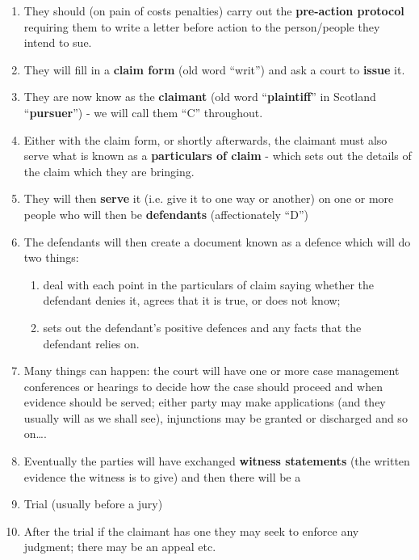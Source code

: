 \documentclass[]{article}
\begin{document}
\begin{enumerate}
\item
  {They should (on pain of costs penalties) carry out the
  }\textbf{pre-action protocol}{ requiring them to write a letter before
  action to the person/people they intend to sue.}
\item
  {They will fill in a }\textbf{claim form}{ (old word ``writ'') and ask
  a court to }\textbf{issue}{ it. }
\item
  {They are now know as the }\textbf{claimant} {(old word} \textbf{}
  {``}\textbf{plaintiff}{''} \textbf{} {in Scotland
  ``}\textbf{pursuer}{'') - we will call them ``C'' throughout.}
\item
  {Either with the claim form, or shortly afterwards, the claimant must
  also serve what is known as a }\textbf{particulars of claim}{ - which
  sets out the details of the claim which they are bringing.}
\item
  {They will then }\textbf{serve}{ it (i.e. give it to one way or
  another) on one or more people who will then be }\textbf{defendants}{
  (affectionately ``D'')}
\item
  The defendants will then create a document known as a defence which
  will do two things:

  \begin{enumerate}
  \item
    deal with each point in the particulars of claim saying whether the
    defendant denies it, agrees that it is true, or does not know;
  \item
    sets out the defendant's positive defences and any facts that the
    defendant relies on.
  \end{enumerate}
\item
  Many things can happen: the court will have one or more case
  management conferences or hearings to decide how the case should
  proceed and when evidence should be served; either party may make
  applications (and they usually will as we shall see), injunctions may
  be granted or discharged and so on\ldots{}.
\item
  {Eventually the parties will have exchanged }\textbf{witness
  statements}{ (the written evidence the witness is to give) and then
  there will be a}
\item
  Trial (usually before a jury)
\item
  After the trial if the claimant has one they may seek to enforce any
  judgment; there may be an appeal etc.
\end{enumerate}
\end{document}
